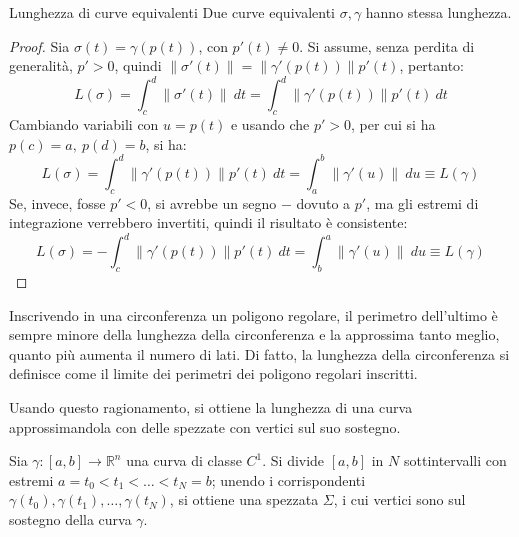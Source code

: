 \documentclass[10pt, a4paper]{scrartcl}
\theoremstyle{definition}
\numberwithin{esempio}{section}
\theoremstyle{definition}
\numberwithin{obs}{section}
\numberwithin{nota}{section}
\numberwithin{equation}{subsection}
\begin{document}
\begin{teorema}
	{Lunghezza di curve equivalenti}{}
	Due curve equivalenti $\sigma , \gamma$ hanno stessa lunghezza.
	\begin{proof}
		Sia $\sigma (t) = \gamma(p(t))$, con $p'(t) \neq 0 $. 
		Si assume, senza perdita di generalit\`a, $p'>0$, quindi $\left\lVert \sigma '(t) \right\rVert = \left\lVert \gamma'(p(t)) \right\rVert p'(t)$, pertanto:
\[
L (\sigma ) = \int_{c} ^d \left\lVert \sigma '(t) \right\rVert \ dt = \int_{c} ^d \left\lVert \gamma '(p(t)) \right\rVert p'(t) \ dt 
\] 
Cambiando variabili con $ u = p(t)$ e usando che $p'>0$, per cui si ha $p(c) = a , \ p(d)= b  $, si ha:
\[
L(\sigma ) = \int_{c} ^d \left\lVert \gamma'(p(t))  \right\rVert p'(t) \ dt = \int_{a} ^b \left\lVert \gamma' (u)\right\rVert  \ du \equiv L(\gamma)
\] 
Se, invece, fosse $p'<0$, si avrebbe un segno $-$ dovuto a $p'$, ma gli estremi di integrazione verrebbero invertiti, quindi il risultato \`e consistente:
\[
	L(\sigma ) = - \int_{c} ^d \left\lVert \gamma'(p(t)) \right\rVert p'(t) \ dt = \int_{b} ^a \left\lVert \gamma'(u)  \right\rVert  \ du \equiv L(\gamma)
\] 
	\end{proof}
\end{teorema}
Inscrivendo in una circonferenza un poligono regolare, il perimetro dell'ultimo \`e sempre minore della lunghezza della circonferenza e la approssima tanto meglio, quanto pi\`u aumenta il numero di lati. 
Di fatto, la lunghezza della circonferenza si definisce come il limite dei perimetri dei poligono regolari inscritti.

Usando questo ragionamento, si ottiene la lunghezza di una curva approssimandola con delle spezzate con vertici sul suo sostegno.

Sia $\gamma : \left[ a,b \right] \to \mathbb{R}^n$ una curva di classe $C^1$. 
Si divide $\left[ a,b \right] $ in $N$ sottintervalli con estremi $a= t_0 < t_1< \ldots< t_N = b$;
unendo i corrispondenti $\gamma(t_0), \gamma(t_1), \ldots, \gamma(t_N)$, si ottiene una spezzata $\Sigma$, i cui vertici sono sul sostegno della curva $\gamma$.
\end{document}
